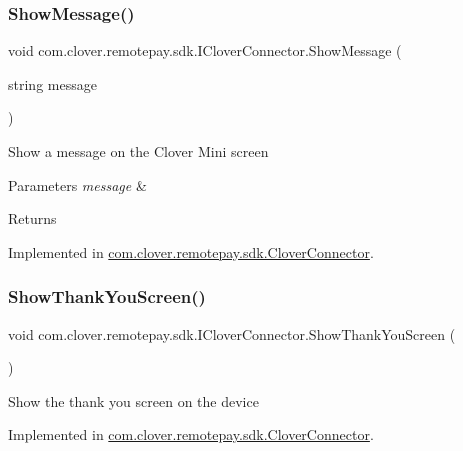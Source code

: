 \subsubsection{\texorpdfstring{Show\+Message()}{ShowMessage()}}
{\footnotesize\ttfamily void com.\+clover.\+remotepay.\+sdk.\+I\+Clover\+Connector.\+Show\+Message (\begin{DoxyParamCaption}\item[{string}]{message }\end{DoxyParamCaption})}



Show a message on the Clover Mini screen 


\begin{DoxyParams}{Parameters}
{\em message} & \\
\hline
\end{DoxyParams}
\begin{DoxyReturn}{Returns}

\end{DoxyReturn}


Implemented in \hyperlink{classcom_1_1clover_1_1remotepay_1_1sdk_1_1_clover_connector_a6efd4dc87eaf16f949b9aeb93e7af464}{com.\+clover.\+remotepay.\+sdk.\+Clover\+Connector}.

\mbox{\label{interfacecom_1_1clover_1_1remotepay_1_1sdk_1_1_i_clover_connector_adb4f9a33f3316cb349a02d05e7ddf902}} 
\subsubsection{\texorpdfstring{Show\+Thank\+You\+Screen()}{ShowThankYouScreen()}}
{\footnotesize\ttfamily void com.\+clover.\+remotepay.\+sdk.\+I\+Clover\+Connector.\+Show\+Thank\+You\+Screen (\begin{DoxyParamCaption}{ }\end{DoxyParamCaption})}



Show the thank you screen on the device 



Implemented in \hyperlink{classcom_1_1clover_1_1remotepay_1_1sdk_1_1_clover_connector_a14b5524c67d9b52c57cd2e972a65d7f1}{com.\+clover.\+remotepay.\+sdk.\+Clover\+Connector}.

